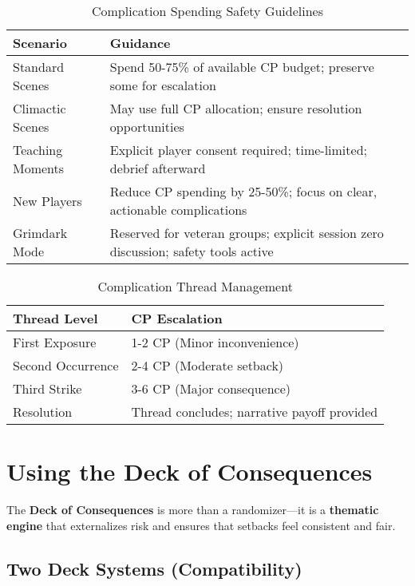 \begin{table}[htbp]
\centering
\caption{Complication Spending Safety Guidelines}
\begin{tabular}{|p{3.5cm}|p{5.5cm}|}
\hline
\textbf{Scenario} & \textbf{Guidance} \\
\hline
Standard Scenes & Spend 50-75\% of available CP budget; preserve some for escalation \\
Climactic Scenes & May use full CP allocation; ensure resolution opportunities \\
Teaching Moments & Explicit player consent required; time-limited; debrief afterward \\
New Players & Reduce CP spending by 25-50\%; focus on clear, actionable complications \\
Grimdark Mode & Reserved for veteran groups; explicit session zero discussion; safety tools active \\
\hline
\end{tabular}
\end{table}

\begin{table}[htbp]
\centering
\caption{Complication Thread Management}
\begin{tabular}{|p{3cm}|p{6cm}|}
\hline
\textbf{Thread Level} & \textbf{CP Escalation} \\
\hline
First Exposure & 1-2 CP (Minor inconvenience) \\
Second Occurrence & 2-4 CP (Moderate setback) \\
Third Strike & 3-6 CP (Major consequence) \\
Resolution & Thread concludes; narrative payoff provided \\
\hline
\end{tabular}
\end{table}


\section*{Using the Deck of Consequences}

The \textbf{Deck of Consequences} is more than a randomizer—it is a \textbf{thematic engine} that externalizes risk and ensures that setbacks feel consistent and fair.

\subsection*{Two Deck Systems (Compatibility)}

